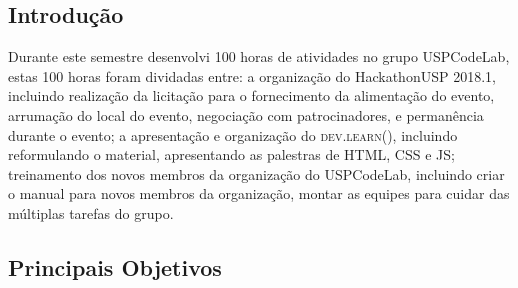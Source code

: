 \documentclass[a0,portrait]{a0poster}
\begin{document}
\vspace{1cm} %


\begin{multicols}{2} %

\begin{tcolorbox}[ breakable,
                   coltext=white,
                   colback=DeepOrange,
                   colframe=DeepOrange,
                   width=36cm,
                   top=0.3cm,
                   enlarge left by=-6mm]
    \section*{Introdução}
\end{tcolorbox}

Durante este semestre desenvolvi 100 horas de atividades no grupo USPCodeLab,
estas 100 horas foram dividadas entre: a organização do HackathonUSP 2018.1, incluindo
realização da licitação para o fornecimento da alimentação do evento, arrumação do local do evento, 
negociação com patrocinadores, e permanência durante o evento; a apresentação e organização do
\textsc{dev.learn()}, incluindo reformulando o material, apresentando as palestras de HTML, CSS e JS; treinamento dos novos membros da 
organização do USPCodeLab, incluindo criar o manual para novos membros da organização, montar as 
equipes para cuidar  das múltiplas tarefas do grupo. \\[0.5cm]



\begin{tcolorbox}[ breakable,
                   coltext=white,
                   colback=DeepOrange,
                   colframe=DeepOrange,
                   width=36cm,
                   top=0.3cm,
                   enlarge left by=-6mm]
\section*{Principais Objetivos}
\end{tcolorbox}


\end{multicols}
\end{document}

